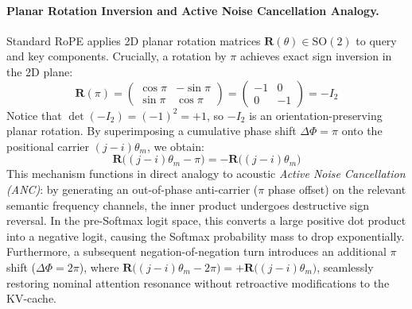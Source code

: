 \documentclass[11pt,a4paper]{article}
\theoremstyle{definition}
\begin{document}
\paragraph{Planar Rotation Inversion and Active Noise Cancellation Analogy.}
Standard RoPE applies 2D planar rotation matrices $\mathbf{R}(\theta) \in \mathrm{SO}(2)$ to query and key components. Crucially, a rotation by $\pi$ achieves exact sign inversion in the 2D plane:
\begin{equation}
\mathbf{R}(\pi) = \begin{pmatrix} \cos\pi & -\sin\pi \\ \sin\pi & \cos\pi \end{pmatrix} = \begin{pmatrix} -1 & 0 \\ 0 & -1 \end{pmatrix} = -I_2
\end{equation}
Notice that $\det(-I_2) = (-1)^2 = +1$, so $-I_2$ is an orientation-preserving planar rotation. By superimposing a cumulative phase shift $\Delta\Phi = \pi$ onto the positional carrier $(j - i)\theta_m$, we obtain:
\begin{equation}
\mathbf{R}\big((j - i)\theta_m - \pi\big) = -\mathbf{R}\big((j - i)\theta_m\big)
\end{equation}
This mechanism functions in direct analogy to acoustic \emph{Active Noise Cancellation (ANC)}: by generating an out-of-phase anti-carrier ($\pi$ phase offset) on the relevant semantic frequency channels, the inner product undergoes destructive sign reversal. In the pre-Softmax logit space, this converts a large positive dot product into a negative logit, causing the Softmax probability mass to drop exponentially. Furthermore, a subsequent negation-of-negation turn introduces an additional $\pi$ shift ($\Delta\Phi = 2\pi$), where $\mathbf{R}\big((j - i)\theta_m - 2\pi\big) = +\mathbf{R}\big((j - i)\theta_m\big)$, seamlessly restoring nominal attention resonance without retroactive modifications to the KV-cache.
\end{document}
